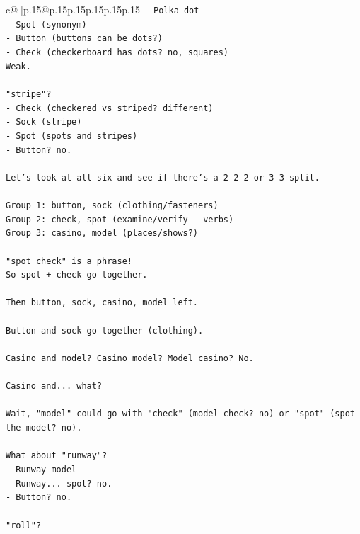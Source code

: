 \documentclass{article}
\begin{document}
{\begin{supertabular}{c@{$\;$}|p{.15\linewidth}@{}p{.15\linewidth}p{.15\linewidth}p{.15\linewidth}p{.15\linewidth}p{.15\linewidth}}
{{{\texttt{{-} Polka dot} \\
\texttt{{-} Spot (synonym)} \\
\texttt{{-} Button (buttons can be dots?)} \\
\texttt{{-} Check (checkerboard has dots? no, squares)} \\
\texttt{Weak.} \\
\\ 
\texttt{"stripe"?} \\
\texttt{{-} Check (checkered vs striped? different)} \\
\texttt{{-} Sock (stripe)} \\
\texttt{{-} Spot (spots and stripes)} \\
\texttt{{-} Button? no.} \\
\\ 
\texttt{Let's look at all six and see if there's a 2{-}2{-}2 or 3{-}3 split.} \\
\\ 
\texttt{Group 1: button, sock (clothing/fasteners)} \\
\texttt{Group 2: check, spot (examine/verify {-} verbs)} \\
\texttt{Group 3: casino, model (places/shows?)} \\
\\ 
\texttt{"spot check" is a phrase!} \\
\texttt{So spot + check go together.} \\
\\ 
\texttt{Then button, sock, casino, model left.} \\
\\ 
\texttt{Button and sock go together (clothing).} \\
\\ 
\texttt{Casino and model? Casino model? Model casino? No.} \\
\\ 
\texttt{Casino and... what?} \\
\\ 
\texttt{Wait, "model" could go with "check" (model check? no) or "spot" (spot the model? no).} \\
\\ 
\texttt{What about "runway"?} \\
\texttt{{-} Runway model} \\
\texttt{{-} Runway... spot? no.} \\
\texttt{{-} Button? no.} \\
\\ 
\texttt{"roll"?} \\
}}}
\end{supertabular}}
\end{document}
